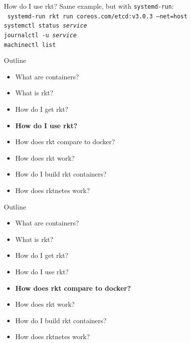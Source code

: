 \documentclass[pdf,aspectratio=169,14pt]{beamer}
\begin{document}
\begin{frame}{How do I use rkt?}
    Same example, but with \texttt{systemd-run}: \\
    \vspace{1em}
    \texttt{\noindent
        \pause
        systemd-run rkt run coreos.com/etcd:v3.0.3 --net=host \\
        \pause
        systemctl status \textit{service} \\
        \pause
        journalctl -u \textit{service} \\
        \pause
        machinectl list
    }
\end{frame}


\begin{frame}
    Outline
    \begin{itemize}
        \item What are containers?
        \item What is rkt?
        \item How do I get rkt?
        \item \textbf{How do I use rkt?}
        \item How does rkt compare to docker?
        \item How does rkt work?
        \item How do I build rkt containers?
        \item How does rktnetes work?
    \end{itemize}
\end{frame}

\begin{frame}
    Outline
    \begin{itemize}
        \item What are containers?
        \item What is rkt?
        \item How do I get rkt?
        \item How do I use rkt?
        \item \textbf{How does rkt compare to docker?}
        \item How does rkt work?
        \item How do I build rkt containers?
        \item How does rktnetes work?
    \end{itemize}
\end{frame}
\end{document}

